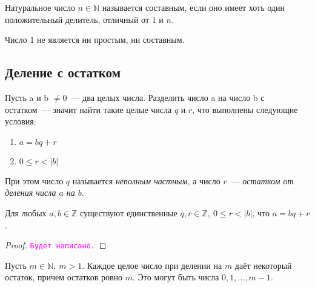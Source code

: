 \documentclass[11pt]{article}
\begin{document}
\begin{definition}

	Натуральное число $n \in \mathbb{N}$ называется составным, если оно имеет хоть один положительный делитель, отличный от $1$ и $n$.

\end{definition}

\begin{remark}

	Число 1 не является ни простым, ни составным.

\end{remark}

\subsection{Деление с остатком}

\begin{definition}
    Пусть a и b $\neq 0$~--- два целых числа. Разделить число  a на число b с остатком~--- значит найти такие целые числа $q$ и $r$, что выполнены следующие условия:

	\begin{enumerate}

	    \item $a = bq + r$

		\item $0 \le r < |b|$

	\end{enumerate}

	При этом число $q$ называется \emph{неполным частным}, а число $r$~--- \emph{остатком от деления числа $a$ на $b$}.

\end{definition}

\begin{theorem}

    Для любых $a, b \in \mathbb{Z}$ существуют единственные $q, r \in \mathbb{Z}, \ 0 \le r < |b|$, что $a = bq + r$.

\end{theorem}

\begin{proof}

    \textcolor{magenta}{\texttt{Будет написано.}}

\end{proof}

\begin{corollary}

	Пусть $m \in \mathbb{N}, \ m > 1$. Каждое целое число при делении на $m$ даёт некоторый остаток, причем остатков ровно $m$.
	Это могут быть числа $0, 1, \ldots, m - 1$.

\end{corollary}
\end{document}
